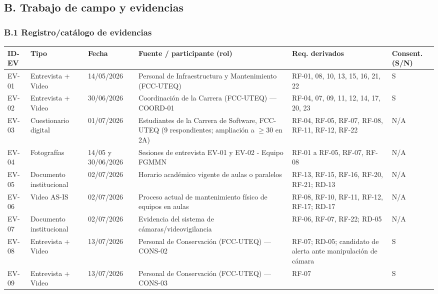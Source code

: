 \subsection*{B. Trabajo de campo y evidencias}


\subsubsection*{B.1 Registro/catálogo de evidencias}


\begingroup
\small
\begin{longtable}{|P{0.1667}|P{0.1667}|P{0.1667}|P{0.1667}|P{0.1667}|P{0.1667}|}
\hline
ID-EV & Tipo & Fecha & Fuente / participante (rol) & Req. derivados & Consent. (S/N) \\ \hline
EV-01 & Entrevista + Video & 14/05/2026 & Personal de Infraestructura y Mantenimiento (FCC-UTEQ) & RF-01, 08, 10, 13, 15, 16, 21, 22 & S \\ \hline
EV-02 & Entrevista + Video & 30/06/2026 & Coordinación de la Carrera (FCC-UTEQ) --- COORD-01 & RF-04, 07, 09, 11, 12, 14, 17, 20, 23 & S \\ \hline
EV-03 & Cuestionario digital & 01/07/2026 & Estudiantes de la Carrera de Software, FCC-UTEQ (9 respondientes; ampliación a $\geq$30 en 2A) & RF-04, RF-05, RF-07, RF-08, RF-11, RF-12, RF-22 & N/A \\ \hline
EV-04 & Fotografías & 14/05 y 30/06/2026 & Sesiones de entrevista EV-01 y EV-02 - Equipo FGMMN & RF-01 a RF-05, RF-07, RF-08 & N/A \\ \hline
EV-05 & Documento institucional & 02/07/2026 & Horario académico vigente de aulas o paralelos & RF-13, RF-15, RF-16, RF-20, RF-21; RD-13 & N/A \\ \hline
EV-06 & Video AS-IS & 02/07/2026 & Proceso actual de mantenimiento físico de equipos en aulas & RF-08, RF-10, RF-11, RF-12, RF-17; RD-17 & N/A \\ \hline
EV-07 & Documento institucional & 02/07/2026 & Evidencia del sistema de cámaras/\allowbreak video\-vigi\-lancia & RF-06, RF-07, RF-22; RD-05 & N/A \\ \hline
EV-08 & Entrevista + Video & 13/07/2026 & Personal de Conservación (FCC-UTEQ) --- CONS-02 & RF-07; RD-05; candidato de alerta ante manipulación de cámara & S \\ \hline
EV-09 & Entrevista + Video & 13/07/2026 & Personal de Conservación (FCC-UTEQ) --- CONS-03 & RF-07 & S \\ \hline

\end{longtable}
